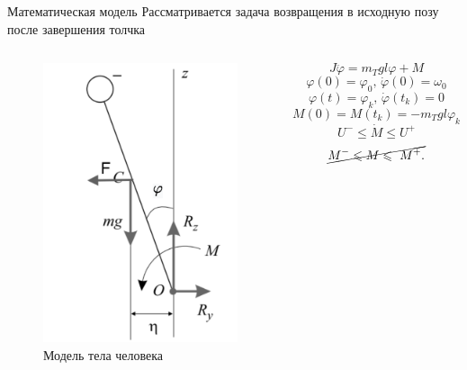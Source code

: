 \documentclass[10pt]{beamer}
\begin{document}
\begin{frame}{Математическая модель}
	Рассматривается задача возвращения в исходную позу после завершения толчка
	\begin{columns}
		\begin{figure}[h!]
			\includegraphics[width=0.55\linewidth]{body_1.pdf}
			\caption{Модель тела человека}
		\end{figure}

		\[
			J\ddot{\varphi}=m_Tgl\varphi+M
		\]
		\[
			\varphi(0)=\varphi_0,\, \dot{\varphi}(0)=\omega_0
		\]
		\[
			\varphi(t)=\varphi_k,\, \dot{\varphi}(t_k)=0
		\]
		\[
			M(0)=M(t_k)=-m_Tgl\varphi_k
		\]
		\[
			U^-\leqslant\dot{M}\leqslant U^+
		\]
		\[
			\cancel{M^-\leqslant M\leqslant\ M^+.}
		\]



	\end{columns}
\end{frame}
\end{document}
